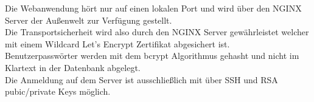 \documentclass[landscape,a0paper,fontscale=0.35]{baposter} %
\begin{document}
\begin{poster}
{\begin{center}
	\label{E-Mail_Tester}
\end{center}
Die Webanwendung hört nur auf einen lokalen Port und wird über den NGINX Server der Außenwelt zur Verfügung gestellt.\\
Die Transportsicherheit wird also durch den NGINX Server gewährleistet welcher mit einem Wildcard Let's Encrypt Zertifikat abgesichert ist.\\
Benutzerpasswörter werden mit dem bcrypt Algorithmus gehasht und nicht im Klartext in der Datenbank abgelegt.\\
Die Anmeldung auf dem Server ist ausschließlich mit über SSH und RSA pubic/private Keys möglich. 
\\

}


%
%
%


%
%



\end{poster}
\end{document}
